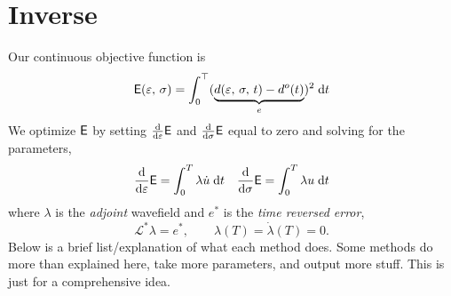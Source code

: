 \documentclass[a4paper,12pt]{article}
\begin{document}
\section{Inverse}
Our continuous objective function is
\begin{align*}
{\sf E}(\varepsilon,\,\sigma) = \int_{0}^\top
(\underbrace{
d(\varepsilon,\,\sigma,\,t)-d^{o}(t)
}_{e})^2
\; {\rm d}t
\end{align*}
We optimize ${\sf E}$ by setting $\frac{{\rm d}}{{\rm d}\varepsilon}{\sf E}$ and 
$\frac{{\rm d}}{{\rm d}\sigma}{\sf E}$ equal to zero and solving for the parameters,
\begin{align*}
&\frac{{\rm d}}{{\rm d}\varepsilon}{\sf E} = \int_{0}^{T} \lambda \dot{u} \; {\rm d}t 
&\frac{{\rm d}}{{\rm d}\sigma}{\sf E} = \int_{0}^{T} \lambda u \; {\rm d}t
\end{align*}
where $\lambda$ is the {\it adjoint} wavefield and $e^*$ is the {\it time reversed error},
\[
\mathcal{L}^* \lambda = e^*, \hspace{2em} \lambda(T)=\dot{\lambda}(T)=0.
\]
%
Below is a brief list/explanation of what each method does. Some methods do more than explained here, 
take more parameters, and output more stuff. This is just for a comprehensive idea.
%
\end{document}
